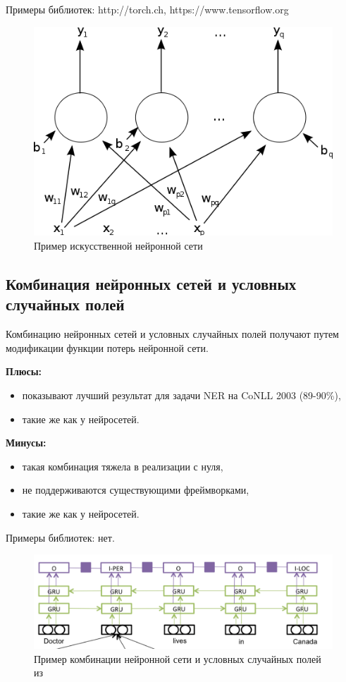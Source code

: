       Примеры библиотек: http://torch.ch, https://www.tensorflow.org
      \newpage
      \begin{figure}
      \centering
      \includegraphics[width=\textwidth]{figures/ann.png}
      \caption{Пример искусственной нейронной сети}
      \label{fig:ann}
      \end{figure}

    \subsection{Комбинация нейронных сетей и условных случайных полей}
      Комбинацию нейронных сетей и условных случайных полей получают путем модификации
      функции потерь нейронной сети.

      \textbf{Плюсы:}
        \begin{itemize}
          \item показывают лучший результат для задачи NER на CoNLL 2003 (89-90\%),
          \item такие же как у нейросетей.
        \end{itemize}

      \textbf{Минусы:}
        \begin{itemize}
          \item такая комбинация тяжела в реализации с нуля,
          \item не поддерживаются существующими фреймворками,
          \item такие же как у нейросетей.
        \end{itemize}
      Примеры библиотек: нет.
      \newpage

      \begin{figure}
      \centering
      \includegraphics[width=\textwidth]{figures/nn+crf.png}
      \caption{Пример комбинации нейронной сети и условных случайных полей из \citep{DBLP:journals/corr/YangSC16}}
      \label{fig:rnncrf}
      \end{figure}

